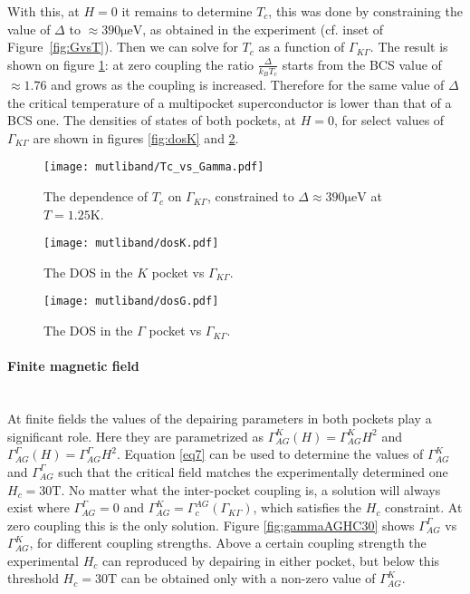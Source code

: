\documentclass[showpacs,superscriptaddress,onecolumn,prb]{revtex4}
\newcommand{\subsubsubsection}[1]{\paragraph{#1}\mbox{}\\}
\begin{document}
With this, at $H=0$ it remains to determine $T_c$, this was done by constraining the value of $\Delta$ to $\approx 390\mathrm{\mu eV}$, as obtained in the experiment  (cf. inset of Figure~\ref{fig:GvsT}). Then we can solve for $T_c$ as a function of $\Gamma_{K\Gamma}$. The result is shown on figure \ref{fig:TcvsGamma}: at zero coupling the ratio $\frac{\Delta}{k_BT_c}$ starts from the BCS value of $\approx1.76$ and grows as the coupling is increased. Therefore for the same value of $\Delta$ the critical temperature of a multipocket superconductor is lower than that of a BCS one.
The densities of states of both pockets, at $H=0$, for select values of $\Gamma_{K\Gamma}$ are shown in figures \ref{fig:dosK} and \ref{fig:dosG}.
\newline

\begin{figure}[h!]
	\centering
	\texttt{[image: mutliband/Tc\_vs\_Gamma.pdf]}
	\caption{The dependence of $T_c$ on $\Gamma_{K\Gamma}$, constrained to $\Delta\approx 390\mathrm{\mu eV}$ at $T=1.25\mathrm{K}$.}
	\label{fig:TcvsGamma}
\end{figure}

\begin{figure}[!htb]
	\centering
	\begin{minipage}{.48\textwidth}
		\centering
		\texttt{[image: mutliband/dosK.pdf]}
		\caption{The DOS in the $K$ pocket vs $\Gamma_{K\Gamma}$.}
		\label{fig:dosK}
	\end{minipage}%
	\begin{minipage}{0.48\textwidth}
		\centering
		\texttt{[image: mutliband/dosG.pdf]}
		\caption{The DOS in the $\Gamma$ pocket vs $\Gamma_{K\Gamma}$.}
		\label{fig:dosG}
	\end{minipage}
\end{figure}



\subsubsubsection{Finite magnetic field}

At finite fields the values of the depairing parameters in both pockets play a significant role. Here they are parametrized as $\Gamma_{AG}^K(H)=\Gamma_{AG}^K H^2$ and $\Gamma_{AG}^\Gamma(H)=\Gamma_{AG}^\Gamma H^2$. Equation \eqref{eq7} can be used to determine the values of $\Gamma_{AG}^K$ and $\Gamma_{AG}^\Gamma$ such that the critical field matches the experimentally determined one $H_c=30\mathrm{T}$. No matter what the inter-pocket coupling is, a solution will always exist where $\Gamma_{AG}^\Gamma=0$ and $\Gamma_{AG}^K=\Gamma_c^{AG}(\Gamma_{K\Gamma})$, which satisfies the $H_c$ constraint. At zero coupling this is the only solution. Figure \ref{fig:gammaAGHC30} shows $\Gamma_{AG}^\Gamma$ vs $\Gamma_{AG}^K$, for different coupling strengths. Above a certain coupling strength the experimental $H_c$ can reproduced by depairing in either pocket, but below this threshold $H_c=30\mathrm{T}$ can be obtained only with a non-zero value of $\Gamma_{AG}^K$. 
\end{document}
